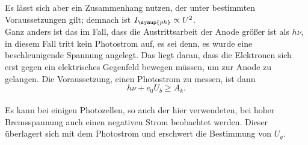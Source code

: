     \noindent Es lässt sich aber ein Zusammenhang nutzen, der unter bestimmten Voraussetzungen gilt;
    demnach ist $I_{\symup{ph}} \propto U^2$. \\
    Ganz anders ist das im Fall, dass die Austrittsarbeit der Anode größer ist als $h \nu$, in diesem Fall tritt kein Photostrom auf, es 
    sei denn, es wurde eine beschleunigende Spannung angelegt. Das liegt daran, dass die Elektronen sich erst gegen ein elektrisches 
    Gegenfeld bewegen müssen, um zur Anode zu gelangen. Die Voraussetzung, einen Photostrom zu messen, ist dann
    \begin{equation*}
        h \nu + e_0 U_b \geq A_k .
    \end{equation*}
    \\
    \noindent Es kann bei einigen Photozellen, so auch der hier verwendeten, bei hoher Bremsspannung auch einen negativen Strom beobachtet werden. Dieser 
    überlagert sich mit dem Photostrom und erschwert die Bestimmung von $U_g$.